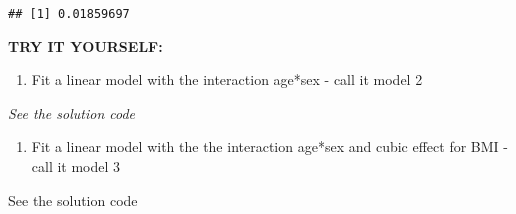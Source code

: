 \documentclass[
]{book}
\newenvironment{Shaded}{\begin{snugshade}}{\end{snugshade}}
\newcommand{\AttributeTok}[1]{\textcolor[rgb]{0.13,0.29,0.53}{#1}}
\newcommand{\CommentTok}[1]{\textcolor[rgb]{0.56,0.35,0.01}{\textit{#1}}}
\newcommand{\DecValTok}[1]{\textcolor[rgb]{0.00,0.00,0.81}{#1}}
\newcommand{\FunctionTok}[1]{\textcolor[rgb]{0.13,0.29,0.53}{\textbf{#1}}}
\newcommand{\NormalTok}[1]{#1}
\newcommand{\OtherTok}[1]{\textcolor[rgb]{0.56,0.35,0.01}{#1}}
\newcommand{\SpecialCharTok}[1]{\textcolor[rgb]{0.81,0.36,0.00}{\textbf{#1}}}
\providecommand{\tightlist}{%
  \setlength{\itemsep}{0pt}\setlength{\parskip}{0pt}}
\begin{document}
\begin{Shaded}
\end{Shaded}

\begin{verbatim}
## [1] 0.01859697
\end{verbatim}

\textbf{TRY IT YOURSELF:}

\begin{enumerate}
\def\labelenumi{\arabic{enumi})}
\tightlist
\item
  Fit a linear model with the interaction age*sex - call it model 2
\end{enumerate}

\emph{See the solution code}

\begin{Shaded}
\end{Shaded}

\begin{enumerate}
\def\labelenumi{\arabic{enumi}.}
\setcounter{enumi}{1}
\tightlist
\item
  Fit a linear model with the the interaction age*sex and cubic effect for
  BMI - call it model 3
\end{enumerate}

See the solution code
\end{document}
